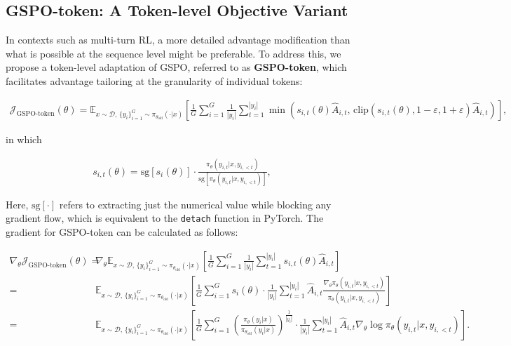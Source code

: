 \subsection{GSPO-token: A Token-level Objective Variant}

In contexts such as multi-turn RL, a more detailed advantage modification than what is possible at the sequence level might be preferable. To address this, we propose a token-level adaptation of GSPO, referred to as \textbf{GSPO-token}, which facilitates advantage tailoring at the granularity of individual tokens:

\begin{align}
\mathcal{J}_\text{GSPO-token}(\theta)
=
\mathbb{E}_{ x \sim \mathcal{D},\, \{y_i\}_{i=1}^G \sim \pi_{\theta_\text{old}}( \cdot | x) }
\left[ 
\frac{1}{G} \sum_{i=1}^{G} \frac{1}{|y_i|} \sum_{t=1}^{|y_i|} 
\min \left( s_{i,t}(\theta) \widehat{A}_{i,t},  \, \mathrm{clip} \left( s_{i,t}(\theta), 1 - {\varepsilon}, 1 + {\varepsilon} \right) \widehat{A}_{i,t} \right) 
\right],
\label{equ:gspo-token}
\end{align}

in which

\begin{align}
s_{i,t}(\theta) 
= \mathrm{sg} \left[ s_{i}(\theta) \right]  \cdot \frac{ \pi_{\theta} (y_{i,t} | x, y_{i,<t}) }{ \mathrm{sg} \left[ \pi_{\theta} (y_{i,t} | x, y_{i,<t}) \right] },
\end{align}

Here, $\mathrm{sg}[\cdot]$ refers to extracting just the numerical value while blocking any gradient flow, which is equivalent to the \texttt{detach} function in PyTorch. The gradient for GSPO-token can be calculated as follows:

\begin{align}
\nabla_{\theta} \mathcal{J}_\text{GSPO-token}(\theta)
=&\ 
\nabla_{\theta} \mathbb{E}_{ x \sim \mathcal{D},\, \{y_i\}_{i=1}^G \sim \pi_{\theta_\text{old}}( \cdot | x) }
\left[ 
\frac{1}{G} \sum_{i=1}^{G}
\frac{1}{|y_i|} \sum_{t=1}^{|y_i|} 
s_{i,t}(\theta) \widehat{A}_{i,t}
\right] \\
=&\ 
\mathbb{E}_{ x \sim \mathcal{D},\, \{y_i\}_{i=1}^G \sim \pi_{\theta_\text{old}}( \cdot | x) }
\left[ 
\frac{1}{G} \sum_{i=1}^{G} s_i (\theta) \cdot \frac{1}{|y_i|} \sum_{t=1}^{|y_i|} 
\widehat{A}_{i,t} \frac{ \nabla_{\theta} \pi_{\theta} (y_{i,t} | x, y_{i,<t}) }{ \pi_{\theta} (y_{i,t} | x, y_{i,<t}) }
\right] \\
=&\ 
\mathbb{E}_{ x \sim \mathcal{D},\, \{y_i\}_{i=1}^G \sim \pi_{\theta_\text{old}}( \cdot | x) }
\left[ 
\frac{1}{G} \sum_{i=1}^{G}  \left( \frac{ \pi_{\theta} (y_i | x) }{ \pi_{\theta_\text{old}} (y_i | x)} \right)^{\frac{1}{|y_i|}}
\cdot \frac{1}{|y_i|} \sum_{t=1}^{|y_i|}
\widehat{A}_{i,t} \nabla_{\theta} \log \pi_{\theta} (y_{i,t} | x, y_{i,<t})  
\right].
\label{equ:gspo-token_grad}
\end{align}


